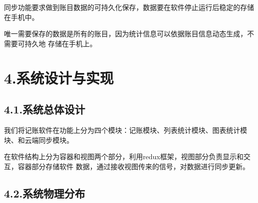 \documentclass{article}
\begin{document}
\noindent{}同步功能要求做到账目数据的可持久化保存，数据要在软件停止运行后稳定的存储在手机中。%

唯一需要保存的数据是所有的账目，因为统计信息可以依据账目信息动态生成，不需要可持久地
存储在手机上。%

\section{4.\hspace*{0.5em}系统设计与实现}\label{section}%

\subsection{4.1.\hspace*{0.5em}系统总体设计}\label{section}%

\noindent{}我们将记账软件在功能上分为四个模块：记账模块、列表统计模块、图表统计模块、和云端同步模块。%

在软件结构上分为容器和视图两个部分，利用redux框架，视图部分负责显示和交互，容器部分存储软件
数据，通过接收视图传来的信号，对数据进行同步更新。%

\subsection{4.2.\hspace*{0.5em}系统物理分布}\label{section}%
\end{document}
